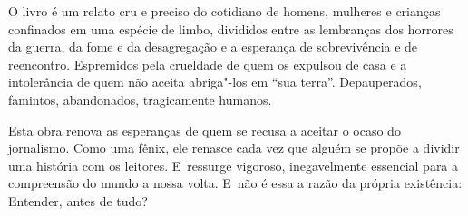 O livro é um relato cru e preciso do cotidiano de homens, mulheres e
crianças confinados em uma espécie de limbo, divididos entre as
lembranças dos horrores da guerra, da fome e da desagregação e a
esperança de sobrevivência e de reencontro. Espremidos pela crueldade de
quem os expulsou de casa e a intolerância de quem não aceita abriga"-los
em ``sua terra''. Depauperados, famintos, abandonados, tragicamente
humanos.

Esta obra renova as esperanças de quem se recusa a aceitar o ocaso do
jornalismo. Como uma fênix, ele renasce cada vez que alguém se propõe a
dividir uma história com os leitores. E~ressurge vigoroso, inegavelmente
essencial para a compreensão do mundo a nossa volta. E~não é essa a
razão da própria existência: Entender, antes de tudo?
